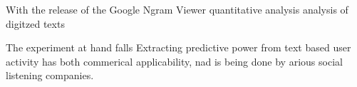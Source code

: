 With the release of the Google Ngram Viewer quantitative analysis analysis of digitzed texts


The experiment at hand falls 
Extracting predictive power from text based user activity has both commerical applicability, nad is being done by arious social listening companies.

